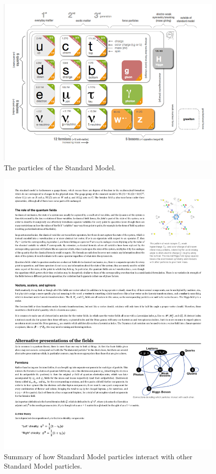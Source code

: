 \begin{figure}[h!]
  \centering
  \includegraphics[width=\hsize]{figures/theory/particles.png}
  \caption{The particles of the Standard Model.} 
  \label{fig:sm_particles}
\end{figure}
\FloatBarrier

\begin{figure}[h!]
  \centering
  \includegraphics[width=\hsize]{figures/theory/particle_interactions.pdf}
  \caption{Summary of how Standard Model particles interact with other Standard Model particles.} 
  \label{fig:sm_particle_interactions}
\end{figure}
\FloatBarrier


